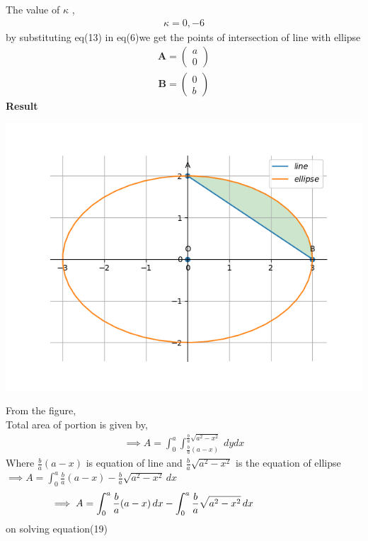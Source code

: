 \documentclass[10pt,a4paper]{report}
\newcommand{\myvec}[1]{\ensuremath{\begin{pmatrix}#1\end{pmatrix}}}
\let\vec\mathbf
\let\vec\mathbf
\begin{document}
\begin{multicols}{2}
The value of $\kappa$ ,\\
\begin{align}
    \kappa =0,-6
\end{align}
by substituting eq(13) in eq(6)we get the
points of intersection of line with ellipse \\
\begin{align}
    \vec{A}=\myvec{
a\\
0
    }
\end{align}
\begin{align}
    \vec{B}=\myvec{
0\\
b
    }
\end{align}
\textbf{Result}
\begin{center}
 \includegraphics[scale=0.5]{fig/conic_fig.png}    
 \end{center}\vspace{1mm}
 From the figure,\\ \vspace{1mm}
Total area of portion is given by, \\ \vspace{1mm}
\begin{align}
\implies A=\int_{0}^{a}\int_{\frac{b}{a}(a-x)}^{\frac{b}{a}\sqrt{a^2-x^2}} \,dydx 
\end{align}
Where $\frac{b}{a}(a-x)$ is equation of line  and $\frac{b}{a}\sqrt{a^2-x^2}$ is the equation of ellipse\\ \vspace{1mm}
$\implies A=\int_{0}^{a} \frac{b}{a}(a-x)-\frac{b}{a}\sqrt{a^2-x^2} \,dx$
\begin{align}
\hspace{-2.25cm}\implies A=\int_{0}^{a} \frac{b}{a}(a-x) \,dx-\int_{0}^{a} \frac{b}{a}\sqrt{a^2-x^2} \,dx 
\end{align}
on solving equation(19)


\end{multicols}
\end{document}
